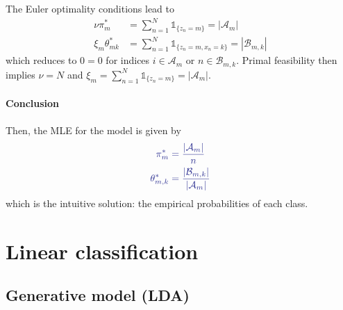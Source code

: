 \documentclass[11pt]{article}
\begin{document}
The Euler optimality conditions lead to
\begin{subequations}
\begin{align}
	\nu\pi^*_m &= 
	\sum_{n=1}^N \mathds{1}_{\{z_n=m\}} = |\mathcal{A}_m| \\
	\xi_m\theta^*_{mk} &= \sum_{n=1}^N \mathds{1}_{\{z_n=m,x_n=k\}} = |\mathcal{B}_{m,k}|
\end{align}
\end{subequations}
which reduces to $0=0$ for indices $i \in \mathcal{A}_m$ or $n\in\mathcal{B}_{m,k}$.
Primal feasibility then implies $\nu = N$ and $\xi_m = \sum_{n=1}^N \mathds{1}_{\{z_n=m\}} = |\mathcal{A}_m|$.

\paragraph{Conclusion} Then, the MLE for the model is given by
\begin{equation}
{\color{Blue}
\begin{aligned}
\pi^*_m &= \frac{|\mathcal{A}_m|}{n} \\
\theta^*_{m,k} &= \frac{
	|\mathcal{B}_{m,k}|
}{
	|\mathcal{A}_m|
}
\end{aligned}}
\end{equation}
which is the intuitive solution: the empirical probabilities of each class.



\section{Linear classification}


\subsection{Generative model (LDA)}
\end{document}
